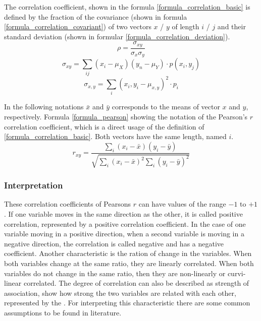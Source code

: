 \documentclass[a4paper,12pt]{report}
\begin{document}
 The correlation coefficient, shown in the formula \ref{formula_correlation_basic} is defined by the fraction of the covariance (shown in formula \ref{formula_correlation_covariant}) of two vectors $x$ / $y$ of length $i$ / $j$ and their standard deviation (shown in formular \ref{formula_correlation_deviation}). \cite{HerzSchlicherSiegener1992}
\smallskip
\begin{equation}
\label{formula_correlation_basic}
	\rho = \frac{\sigma_{xy}}{\sigma_{x}\sigma_{y}}
\end{equation}
\begin{equation}
\label{formula_correlation_covariant}
	\sigma_{xy} = \sum_{ij}(x_i-\mu_X)(y_n-\mu_Y) \cdot p(x_i,y_j)
\end{equation}
\begin{equation}
\label{formula_correlation_deviation}
	\sigma_{x,y} = \sum_{i}(x_i,y_i-\mu_{x,y})^2 \cdot p_i
\end{equation}

\bigskip

\par In the following notations $\bar{x}$ and $\bar{y}$ corresponds to the means of vector $x$ and $y$, respectively. Formula \ref{formula_pearson} showing the notation of the Pearson's $r$ correlation coefficient, which is a direct usage of the definition of \ref{formula_correlation_basic}. Both vectors have the same length, named $i$. 
	\cite{BenestyChenHuang2009,Zychlinski2018}
\smallskip
\begin{equation}
\label{formula_pearson}	
	r_{xy} =  \frac{\sum_{i}{(x_i-\bar{x})(y_i-\bar{y})}}{\sqrt{\sum_{i}{(x_i-\bar{x})^2}\sum_{i}{(y_i-\bar{y})^2}}}
\end{equation}



\subsubsection{Interpretation}

These correlation coefficients of Pearsons $r$ can have values of the range $-1$ to $+1$. If one variable moves in the same direction as the other, it is called positive correlation, represented by a positive correlation coefficient. In the case of one variable moving in a positive direction, when a second variable is moving in a negative direction, the correlation is called negative and has a negative coefficient. Another characteristic is the ration of change in the variables. When both variables change at the same ratio, they are linearly correlated. When both variables do not change in the same ratio, then they are non-linearly or curvi-linear correlated. The degree of correlation can also be described as strength of association, show how strong the two variables are related with each other, represented by the . For interpreting this characteristic there are some common assumptions to be found in literature.
\end{document}
